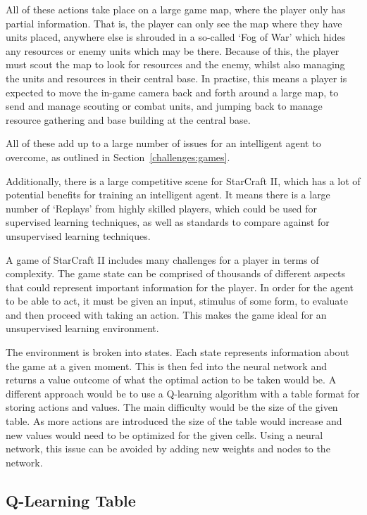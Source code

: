 All of these actions take place on a large game map, where the player only has
partial information. That is, the player can only see the map where they have
units placed, anywhere else is shrouded in a so-called `Fog of War' which hides
any resources or enemy units which may be there.
Because of this, the player must scout the map to look for resources and the
enemy, whilst also managing the units and resources in their central base.
In practise, this means a player is expected to move the in-game camera back
and forth around a large map, to send and manage scouting or combat units,
and jumping back to manage resource gathering and base building at the central
base.

All of these add up to a large number of issues for an intelligent agent to
overcome, as outlined in Section~\ref{challenges:games}.

Additionally, there is a large competitive scene for StarCraft
II\cite{scIIprof}, which has a lot of potential benefits for training an
intelligent agent. It means there is a large number of `Replays' from highly
skilled players, which could be used for supervised learning techniques, as well
as standards to compare against for unsupervised learning techniques.


A game of StarCraft II includes many challenges for a player in terms of
complexity. The game state can be comprised of thousands of different aspects
that could represent important information for the player. In order for the
agent to be able to act, it must be given an input, stimulus of some form, to
evaluate and then proceed with taking an action. This makes the game ideal for
an unsupervised learning environment.

The environment is broken into states. Each state represents information about
the game at a given moment. This is then fed into the neural network and
returns a value outcome of what the optimal action to be taken would be. A
different approach would be to use a Q-learning algorithm with a table format
for storing actions and values. The main difficulty would be the size of the
given table. As more actions are introduced the size of the table would
increase and new values would need to be optimized for the given cells. Using a
neural network, this issue can be avoided by adding new weights and nodes to the
network.

\subsection{Q-Learning Table}


